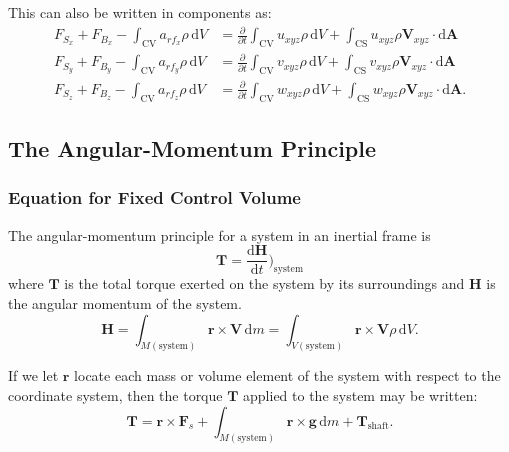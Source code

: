 This can also be written in components as:
\begin{align*}
  F_{S_x} + F_{B_x} - \int_{\mathrm{CV}} a_{rf_x} \rho \, \mathrm{d}V &= \frac{\partial }{\partial t} \int_{\mathrm{CV}} u_{xyz} \rho \, \mathrm{d}V + \int_{\mathrm{CS}} u_{xyz} \rho \textbf{V}_{xyz} \cdot \mathrm{d}\textbf{A} \\
  F_{S_y} + F_{B_y} - \int_{\mathrm{CV}} a_{rf_y} \rho \, \mathrm{d}V &= \frac{\partial }{\partial t} \int_{\mathrm{CV}} v_{xyz} \rho \, \mathrm{d}V + \int_{\mathrm{CS}} v_{xyz} \rho \textbf{V}_{xyz} \cdot \mathrm{d}\textbf{A} \\
  F_{S_z} + F_{B_z} - \int_{\mathrm{CV}} a_{rf_z} \rho \, \mathrm{d}V &= \frac{\partial }{\partial t} \int_{\mathrm{CV}} w_{xyz} \rho \, \mathrm{d}V + \int_{\mathrm{CS}} w_{xyz} \rho \textbf{V}_{xyz} \cdot \mathrm{d}\textbf{A}
.\end{align*}

\subsection{The Angular-Momentum Principle}

\subsubsection{Equation for Fixed Control Volume}
The angular-momentum principle for a system in an inertial frame is
\[ 
\textbf{T} = \frac{\mathrm{d}\textbf{H}}{\mathrm{d}t} \bigg)_{\mathrm{system}}
\]
where $\textbf{T}$ is the total torque exerted on the system by its surroundings and $\textbf{H}$ is the angular momentum of the system.
\[ 
\textbf{H} = \int_{M (\mathrm{system})} \textbf{r} \times \textbf{V} \, \mathrm{d}m = \int_{V (\mathrm{system})} \textbf{r} \times \textbf{V} \rho \, \mathrm{d}V
.\]

If we let $\textbf{r}$ locate each mass or volume element of the system with respect to the coordinate system, then the torque $\textbf{T}$ applied to the system may be written:
\[ 
\textbf{T} = \textbf{r} \times \textbf{F}_s + \int_{M (\mathrm{system})} \textbf{r} \times \textbf{g} \, \mathrm{d}m + \textbf{T}_{\mathrm{shaft}}
.\]

